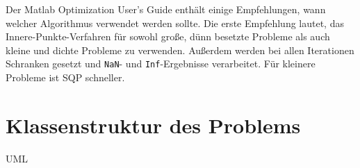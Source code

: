 Der Matlab Optimization User's Guide enthält einige Empfehlungen, wann welcher Algorithmus verwendet werden sollte. Die erste Empfehlung lautet, das Innere-Punkte-Verfahren für sowohl große, dünn besetzte Probleme als auch kleine und dichte Probleme zu verwenden. Außerdem werden bei allen Iterationen Schranken gesetzt und \texttt{NaN}- und \texttt{Inf}-Ergebnisse verarbeitet. Für kleinere Probleme ist SQP schneller.


\section{Klassenstruktur des Problems}

UML


